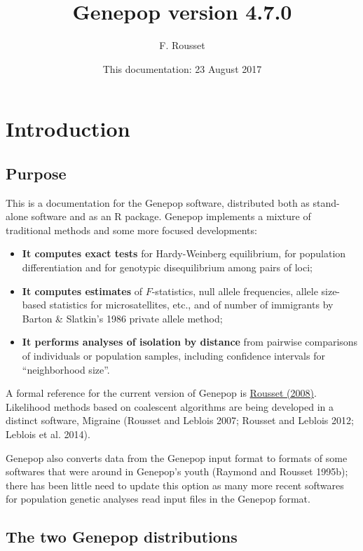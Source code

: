 \documentclass[12pt,]{book}
\title{Genepop version 4.7.0}
\author{F. Rousset}
\date{This documentation: 23 August 2017}
\theoremstyle{definition}
\theoremstyle{definition}
\theoremstyle{definition}
\theoremstyle{remark}
\begin{document}
\maketitle

{
\setcounter{tocdepth}{1}
\tableofcontents
}
\chapter{Introduction}\label{introduction}

\section{Purpose}\label{purpose}

This is a documentation for the Genepop software, distributed both as
stand-alone software and as an R package. Genepop implements a mixture
of traditional methods and some more focused developments:

\begin{itemize}
\item
  \textbf{It computes exact tests} for Hardy-Weinberg equilibrium, for
  population differentiation and for genotypic disequilibrium among
  pairs of loci;
\item
  \textbf{It computes estimates} of \(F\)-statistics, null allele
  frequencies, allele size-based statistics for microsatellites, etc.,
  and of number of immigrants by Barton \& Slatkin's 1986 private allele
  method;
\item
  \textbf{It performs analyses of isolation by distance} from pairwise
  comparisons of individuals or population samples, including confidence
  intervals for ``neighborhood size''.
\end{itemize}

A formal reference for the current version of Genepop is
\href{http://dx.doi.org/10.1111/j.1471-8286.2007.01931.x}{Rousset
(2008)}. Likelihood methods based on coalescent algorithms are being
developed in a distinct software, Migraine (Rousset and Leblois 2007;
Rousset and Leblois 2012; Leblois et al. 2014).

Genepop also converts data from the Genepop input format to formats of
some softwares that were around in Genepop's youth (Raymond and Rousset
1995b); there has been little need to update this option as many more
recent softwares for population genetic analyses read input files in the
Genepop format.

\section{The two Genepop
distributions}\label{the-two-genepop-distributions}
\end{document}
